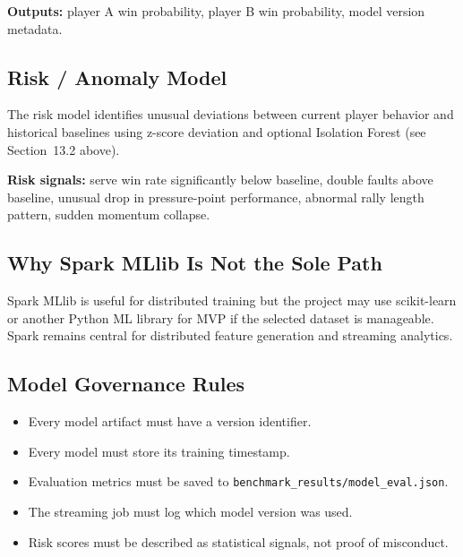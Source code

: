 \documentclass[11pt,a4paper]{article}
\begin{document}
\textbf{Outputs:} player A win probability, player B win probability, model version metadata.

\subsection{Risk / Anomaly Model}

The risk model identifies unusual deviations between current player behavior and historical
baselines using z-score deviation and optional Isolation Forest (see Section~13.2 above).

\textbf{Risk signals:} serve win rate significantly below baseline, double faults above baseline,
unusual drop in pressure-point performance, abnormal rally length pattern, sudden momentum
collapse.

\subsection{Why Spark MLlib Is Not the Sole Path}

Spark MLlib is useful for distributed training but the project may use scikit-learn or another
Python ML library for MVP if the selected dataset is manageable. Spark remains central for
distributed feature generation and streaming analytics.

\subsection{Model Governance Rules}

\begin{itemize}[nosep]
  \item Every model artifact must have a version identifier.
  \item Every model must store its training timestamp.
  \item Evaluation metrics must be saved to \texttt{benchmark\_results/model\_eval.json}.
  \item The streaming job must log which model version was used.
  \item Risk scores must be described as statistical signals, not proof of misconduct.
\end{itemize}
\end{document}
